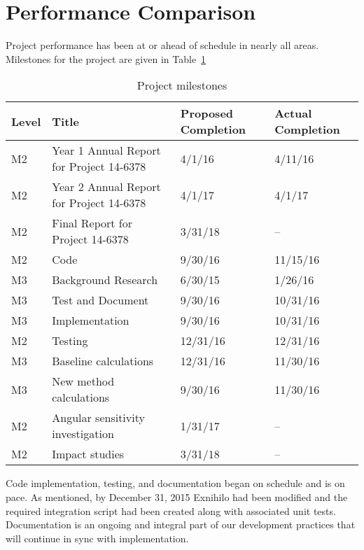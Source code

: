 \documentclass[12pt]{article}
\begin{document}
\section{Performance Comparison}
\label{sect::perf-comp} 
Project performance has been at or ahead of schedule in nearly all areas. 
Milestones for the project are given in Table~\ref{tab:milestones}
\begin{table}[h!]
\begin{center}
\caption{Project milestones}
\begin{tabular}{ | l | l | l | l | }
\hline
\textbf{Level} & \textbf{Title} & \textbf{Proposed Completion} & \textbf{Actual Completion} \\ \hline
M2 & Year 1 Annual Report for Project 14-6378 & 4/1/16 & 4/11/16 \\
M2 & Year 2 Annual Report for Project 14-6378 & 4/1/17 & 4/1/17 \\ 
M2 & Final Report for Project 14-6378 & 3/31/18 & -- \\ \hline
M2 & Code & 9/30/16 & 11/15/16 \\
M3 & Background Research & 6/30/15 & 1/26/16 \\
M3 & Test and Document & 9/30/16 & 10/31/16 \\
M3 & Implementation & 9/30/16 & 10/31/16 \\  \hline
M2 & Testing & 12/31/16 & 12/31/16 \\
M3 & Baseline calculations & 12/31/16 & 11/30/16 \\
M3 & New method calculations & 9/30/16 & 11/30/16 \\ \hline
M2 & Angular sensitivity investigation & 1/31/17 & -- \\ \hline
M2 & Impact studies & 3/31/18 & -- \\
\hline
\end{tabular}
\label{tab:milestones}
\end{center}
\end{table}

Code implementation, testing, and documentation began on schedule and is on pace. 
As mentioned, by December 31, 2015 Exnihilo had been modified and the required integration script had been created along with associated unit tests. 
Documentation is an ongoing and integral part of our development practices that will continue in sync with implementation. 
\end{document}
